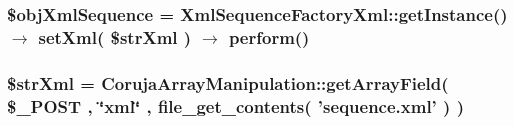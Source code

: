 \hypertarget{xml_to_diagram_8php_eefa469c1b13fe1fec040c910b720034}{
\subsubsection[{\$objXmlSequence}]{\setlength{\rightskip}{0pt plus 5cm}\$objXmlSequence = XmlSequenceFactoryXml::getInstance() $\rightarrow$ setXml( \$strXml ) $\rightarrow$ perform()}}
\label{xml_to_diagram_8php_eefa469c1b13fe1fec040c910b720034}


\hypertarget{xml_to_diagram_8php_2651e3074f6303e4683f2aff16ec1fbd}{
\subsubsection[{\$strXml}]{\setlength{\rightskip}{0pt plus 5cm}\$strXml = CorujaArrayManipulation::getArrayField( \$\_\-POST , \char`\"{}xml\char`\"{} , file\_\-get\_\-contents( 'sequence.xml' ) )}}
\label{xml_to_diagram_8php_2651e3074f6303e4683f2aff16ec1fbd}


